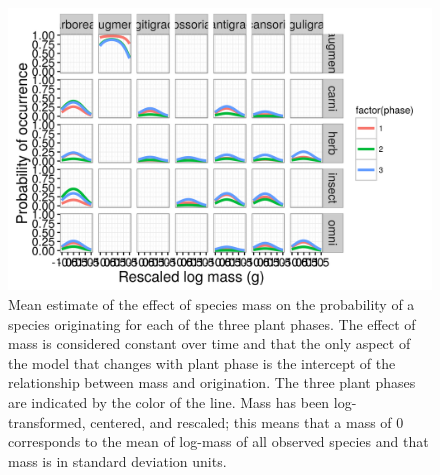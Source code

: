 \documentclass[12pt,letterpaper]{article}
\begin{document}
\begin{figure}[ht]
  \centering
  \includegraphics[width=\textwidth,height=0.8\textheight,keepaspectratio=true]{figure/mass_on_origin_bd}
  \caption[Effect of mass on probability of species origination as estimated from the birth-death model]{Mean estimate of the effect of species mass on the probability of a species originating for each of the three plant phases. The effect of mass is considered constant over time and that the only aspect of the model that changes with plant phase is the intercept of the relationship between mass and origination. The three plant phases are indicated by the color of the line. Mass has been log-transformed, centered, and rescaled; this means that a mass of 0 corresponds to the mean of log-mass of all observed species and that mass is in standard deviation units.}
  \label{fig:mass_origin}
\end{figure}
\end{document}
